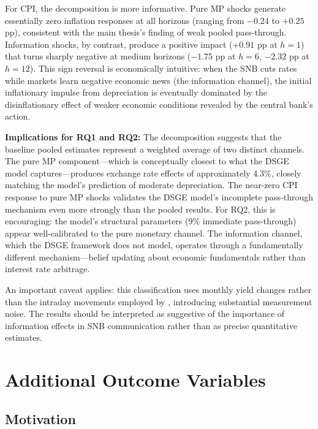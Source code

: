 \documentclass[12pt,a4paper]{article}
\begin{document}
For CPI, the decomposition is more informative. Pure MP shocks generate essentially zero inflation responses at all horizons (ranging from $-0.24$ to $+0.25$ pp), consistent with the main thesis's finding of weak pooled pass-through. Information shocks, by contrast, produce a positive impact ($+0.91$ pp at $h=1$) that turns sharply negative at medium horizons ($-1.75$ pp at $h=6$, $-2.32$ pp at $h=12$). This sign reversal is economically intuitive: when the SNB cuts rates while markets learn negative economic news (the information channel), the initial inflationary impulse from depreciation is eventually dominated by the disinflationary effect of weaker economic conditions revealed by the central bank's action.

\textbf{Implications for RQ1 and RQ2:} The decomposition suggests that the baseline pooled estimates represent a weighted average of two distinct channels. The pure MP component---which is conceptually closest to what the DSGE model captures---produces exchange rate effects of approximately 4.3\%, closely matching the model's prediction of moderate depreciation. The near-zero CPI response to pure MP shocks validates the DSGE model's incomplete pass-through mechanism even more strongly than the pooled results. For RQ2, this is encouraging: the model's structural parameters (9\% immediate pass-through) appear well-calibrated to the pure monetary channel. The information channel, which the DSGE framework does not model, operates through a fundamentally different mechanism---belief updating about economic fundamentals rather than interest rate arbitrage.

An important caveat applies: this classification uses monthly yield changes rather than the intraday movements employed by \citet{jarocinski2020}, introducing substantial measurement noise. The results should be interpreted as suggestive of the importance of information effects in SNB communication rather than as precise quantitative estimates.


\section{Additional Outcome Variables}\label{sec:outcomes}

\subsection{Motivation}
\end{document}
